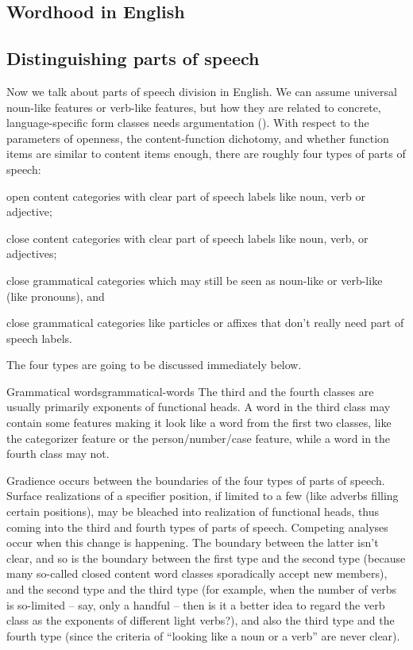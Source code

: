 \documentclass[UTF8, a4paper, oneside, scheme=plain]{ctexrep}
\begin{document}
\subsection{Wordhood in English}


\subsection{Distinguishing parts of speech}

Now we talk about parts of speech division in English.
We can assume universal noun-like features or verb-like features,
but how they are related to concrete, language-specific form classes needs argumentation 
().
With respect to the parameters of 
openness, the content-function dichotomy,
and whether function items are similar to content items enough,
there are roughly four types of parts of speech:
\begin{enumerate*}
    \item open content categories with clear part of speech labels like noun, verb or adjective;
    \item close content categories with clear part of speech labels like noun, verb, or adjectives;
    \item close grammatical categories which may still be seen as noun-like or verb-like (like pronouns), and 
    \item close grammatical categories like particles or affixes that don't really need part of speech labels.
\end{enumerate*}
The four types are going to be discussed immediately below.

\begin{theorybox}{Grammatical words}{grammatical-words}
    The third and the fourth classes are usually primarily exponents of functional heads.
    A word in the third class may contain some features making it look like a word from the first two classes,
    like the categorizer feature or the person/number/case feature,
    while a word in the fourth class may not.

    Gradience occurs between the boundaries of the four types of parts of speech.
    Surface realizations of a specifier position,
    if limited to a few (like adverbs filling certain positions),
    may be bleached into realization of functional heads,
    thus coming into the third and fourth types of parts of speech.
    Competing analyses occur when this change is happening.
    The boundary between the latter isn't clear,
    and so is the boundary between the first type and the second type
    (because many so-called closed content word classes 
    sporadically accept new members),
    and the second type and the third type
    (for example, when the number of verbs is so-limited -- say, only a handful -- 
    then is it a better idea to regard the verb class as the exponents of different light verbs?),
    and also the third type and the fourth type
    (since the criteria of ``looking like a noun or a verb'' are never clear).
\end{theorybox}
\end{document}
